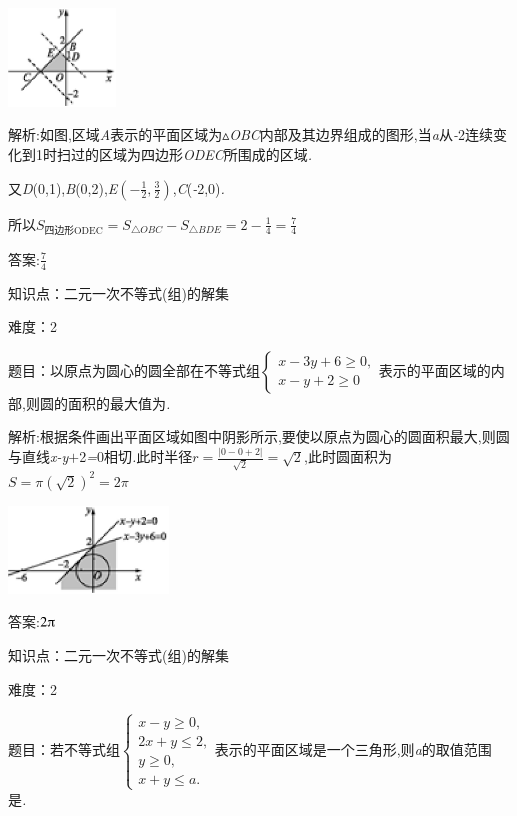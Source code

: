 \documentclass{article} %
\begin{document}
 \includegraphics*[width=1.13in, height=1.03in, keepaspectratio=false]{image1549}

 解析:如图,区域\textit{A}表示的平面区域为$\mathrm{\vartriangle}$\textit{OBC}内部及其边界组成的图形,当\textit{a}从\textit{-}2连续变化到1时扫过的区域为四边形\textit{ODEC}所围成的区域\textit{.}

又\textit{D}(0,1),\textit{B}(0,2),\textit{E}$(-\frac{1}{2},\frac{3}{2})$,\textit{C}(\textit{-}2,0)\textit{.}

所以$S_{\text{四边形ODEC}}=S_{\triangle OBC}-S_{\triangle BDE}=2-\frac{1}{4}=\frac{7}{4}$

 答案:$\frac{7}{4}$

知识点：二元一次不等式(组)的解集

难度：2

 题目：以原点为圆心的圆全部在不等式组$
\begin{cases}
x-3y+6 \ge 0,\\
x-y +2 \ge 0
\end{cases}$表示的平面区域的内部,则圆的面积的最大值为\textit{\underbar{　　　　　}.~}

 解析:根据条件画出平面区域如图中阴影所示,要使以原点为圆心的圆面积最大,则圆与直线\textit{x-y$+$}2\textit{=}0相切\textit{.}此时半径$r = \frac{|0-0+2|}{\sqrt{2}}=\sqrt{2}$,此时圆面积为$S=\pi{(\sqrt{2})}^2=2\pi$

 \includegraphics*[width=1.68in, height=0.92in, keepaspectratio=false]{image1556}

 答案:$2\piup$

知识点：二元一次不等式(组)的解集

难度：2

 题目：若不等式组$
\begin{cases}
x-y \ge 0,\\
2x+y \le 2,\\
y \ge 0,\\
x+y \le a.
\end{cases}$表示的平面区域是一个三角形,则\textit{a}的取值范围是\textit{\underbar{　　　　　　　}.~}
\end{document}

